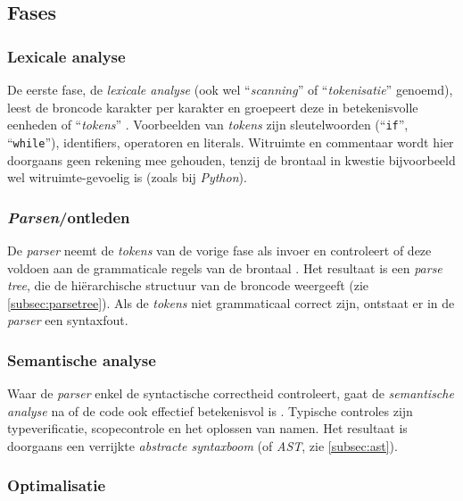 \subsection{Fases}%
\label{subsec:compilerfases}

\subsubsection{Lexicale analyse}%

De eerste fase, de \emph{lexicale analyse} (ook wel ``\emph{scanning}'' of ``\emph{tokenisatie}'' genoemd), leest de broncode karakter per karakter en groepeert deze in betekenisvolle eenheden of ``\emph{tokens}'' \autocite{Seidl2012}. Voorbeelden van \emph{tokens} zijn sleutelwoorden (``\texttt{if}'', ``\texttt{while}''), identifiers, operatoren en literals. Witruimte en commentaar wordt hier doorgaans geen rekening mee gehouden, tenzij de brontaal in kwestie bijvoorbeeld wel witruimte-gevoelig is (zoals bij \emph{Python}).

\subsubsection{\emph{Parsen}/ontleden}%

De \emph{parser} neemt de \emph{tokens} van de vorige fase als invoer en controleert of deze voldoen aan de grammaticale regels van de brontaal \autocite{Seidl2012}. Het resultaat is een \emph{parse tree}, die de hiërarchische structuur van de broncode weergeeft (zie \autoref{subsec:parsetree}). Als de \emph{tokens} niet grammaticaal correct zijn, ontstaat er in de \emph{parser} een syntaxfout.

\subsubsection{Semantische analyse}%

Waar de \emph{parser} enkel de syntactische correctheid controleert, gaat de \emph{semantische analyse} na of de code ook effectief betekenisvol is \autocite{Seidl2012}. Typische controles zijn typeverificatie, scopecontrole en het oplossen van namen. Het resultaat is doorgaans een verrijkte \emph{abstracte syntaxboom} (of \emph{AST}, zie \autoref{subsec:ast}).

\subsubsection{Optimalisatie}%

